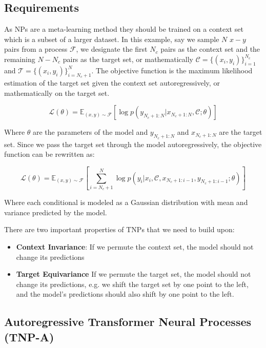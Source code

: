 \documentclass[../../main.tex]{subfiles}
\begin{document}

\subsection{Requirements}

As NPs are a meta-learning method they should be trained on a context set which is a subset of a larger dataset. In this example, say we sample $N$ $x-y$ pairs from a process $\mathcal{F}$, we designate the first $N_c$ pairs as the context set and the remaining $N-N_c$ pairs as the target set, or mathematically $\mathcal{C} = \{(x_i, y_i)\}_{i=1}^{N_c}$ and $\mathcal{T} = \{(x_i, y_i)\}_{i=N_c+1}^{N}$. The objective function is the maximum likelihood estimation of the target set given the context set autoregressively, or mathematically on the target set.


\begin{equation}
	\mathcal{L}(\theta) = \mathbb{E}_{(x, y) \sim \mathcal{F}} \left[ \log p(y_{N_c+1:N} | x_{N_c+1:N}, \mathcal{C}; \theta) \right]
	\end{equation}

Where $\theta$ are the parameters of the model and $y_{N_c+1:N}$ and $x_{N_c+1:N}$ are the target set. Since we pass the target set through the model autoregressively, the objective function can be rewritten as:

\begin{equation}
	\mathcal{L}(\theta) = \mathbb{E}_{(x, y) \sim \mathcal{F}} \left[ \sum_{i=N_c+1}^{N} \log p(y_i | x_i, \mathcal{C}, x_{N_c+1:i-1}, y_{N_c+1:i-1}; \theta) \right]
\end{equation}

Where each conditional is modeled as a Gaussian distribution with mean and variance predicted by the model. 

There are two important properties of TNPs that we need to build upon:

\begin{itemize}
	\item \textbf{Context Invariance}: If we permute the context set, the model should not change its predictions
	 \item \textbf{Target Equivariance} If we permute the target set, the model should not change its predictions, e.g. we shift the target set by one point to the left, and the model's predictions should also shift by one point to the left.
\end{itemize}

\subsection{Autoregressive Transformer Neural Processes (TNP-A)}
\end{document}
